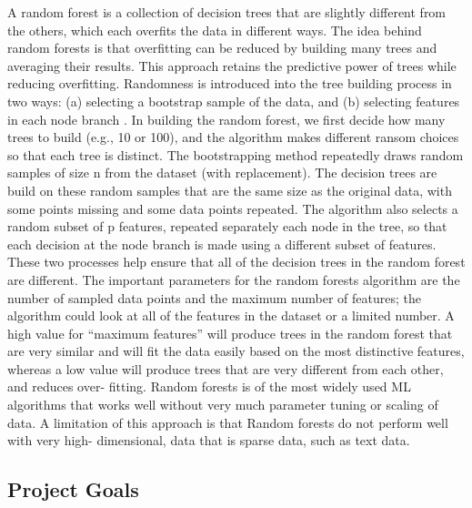 \documentclass[sigconf]{acmart}
\begin{document}
A random forest is a collection of decision trees that are slightly different 
from the others, which each overfits the data in different ways. The idea 
behind random forests is that overfitting can be reduced by building many 
trees and averaging their results. This approach retains the predictive power 
of trees while reducing overfitting. Randomness is introduced into the tree 
building process in two ways: (a) selecting a bootstrap sample of the data, 
and (b) selecting features in each node branch \cite{muller17,raschka17}. In 
building the random forest, we first decide how many trees to build (e.g., 10 
or 100), and the algorithm makes different ransom choices so that each tree is 
distinct. The bootstrapping method repeatedly draws random samples of size n 
from the dataset (with replacement). The decision trees are build on these 
random samples that are the same size as the original data, with some points 
missing and some data points repeated. The algorithm also selects a random 
subset of p features, repeated separately each node in the tree, so that 
each decision at the node branch is made using a different subset of features.
These two processes help ensure that all of the decision trees in the random
forest are different. The important parameters for the random forests 
algorithm are the number of sampled data points and the maximum number of 
features; the algorithm could look at all of the features in the dataset
or a limited number. A high value for ``maximum features'' will produce 
trees in the random forest that are very similar and will fit the data 
easily based on the most distinctive features, whereas a low value will 
produce trees that are very different from each other, and reduces over-
fitting. Random forests is of the most widely used ML algorithms that works 
well without very much parameter tuning or scaling of data. A limitation of 
this approach is that Random forests do not perform well with very high-
dimensional, data that is sparse data, such as text data.


\subsection{Project Goals} 
\end{document}
